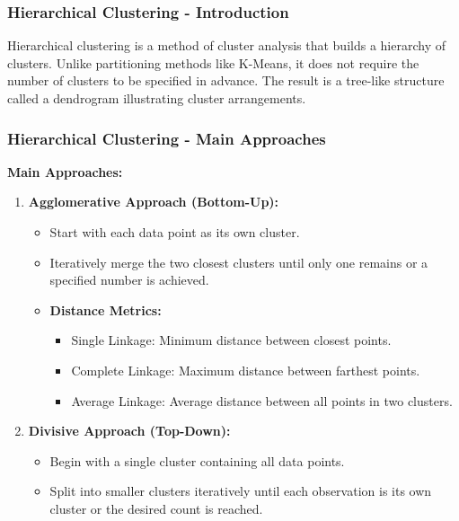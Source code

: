 \documentclass[aspectratio=169]{beamer}
\begin{document}
\begin{frame}[fragile]
    \frametitle{Hierarchical Clustering - Introduction}
    Hierarchical clustering is a method of cluster analysis that builds a hierarchy of clusters. 
    Unlike partitioning methods like K-Means, it does not require the number of clusters to be specified in advance. 
    The result is a tree-like structure called a dendrogram illustrating cluster arrangements.
\end{frame}

\begin{frame}[fragile]
    \frametitle{Hierarchical Clustering - Main Approaches}
    \textbf{Main Approaches:}
    \begin{enumerate}
        \item \textbf{Agglomerative Approach (Bottom-Up):}
        \begin{itemize}
            \item Start with each data point as its own cluster.
            \item Iteratively merge the two closest clusters until only one remains or a specified number is achieved.
            \item \textbf{Distance Metrics:}
            \begin{itemize}
                \item Single Linkage: Minimum distance between closest points.
                \item Complete Linkage: Maximum distance between farthest points.
                \item Average Linkage: Average distance between all points in two clusters.
            \end{itemize}
        \end{itemize}
        
        \item \textbf{Divisive Approach (Top-Down):}
        \begin{itemize}
            \item Begin with a single cluster containing all data points.
            \item Split into smaller clusters iteratively until each observation is its own cluster or the desired count is reached.
        \end{itemize}
    \end{enumerate}
\end{frame}
\end{document}
